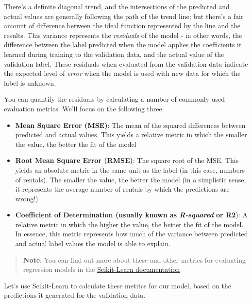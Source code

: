 \documentclass[11pt]{article}
\providecommand{\tightlist}{%
      \setlength{\itemsep}{0pt}\setlength{\parskip}{0pt}}
\begin{document}
    There's a definite diagonal trend, and the intersections of the
predicted and actual values are generally following the path of the
trend line; but there's a fair amount of difference between the ideal
function represented by the line and the results. This variance
represents the \emph{residuals} of the model - in other words, the
difference between the label predicted when the model applies the
coefficients it learned during training to the validation data, and the
actual value of the validation label. These residuals when evaluated
from the validation data indicate the expected level of \emph{error}
when the model is used with new data for which the label is unknown.

You can quantify the residuals by calculating a number of commonly used
evaluation metrics. We'll focus on the following three:

\begin{itemize}
\tightlist
\item
  \textbf{Mean Square Error (MSE)}: The mean of the squared differences
  between predicted and actual values. This yields a relative metric in
  which the smaller the value, the better the fit of the model
\item
  \textbf{Root Mean Square Error (RMSE)}: The square root of the MSE.
  This yields an absolute metric in the same unit as the label (in this
  case, numbers of rentals). The smaller the value, the better the model
  (in a simplistic sense, it represents the average number of rentals by
  which the predictions are wrong!)
\item
  \textbf{Coefficient of Determination (usually known as
  \emph{R-squared} or R2}): A relative metric in which the higher the
  value, the better the fit of the model. In essence, this metric
  represents how much of the variance between predicted and actual label
  values the model is able to explain.
\end{itemize}

\begin{quote}
\textbf{Note}: You can find out more about these and other metrics for
evaluating regression models in the
\href{https://scikit-learn.org/stable/modules/model_evaluation.html\#regression-metrics}{Scikit-Learn
documentation}
\end{quote}

Let's use Scikit-Learn to calculate these metrics for our model, based
on the predictions it generated for the validation data.
\end{document}
